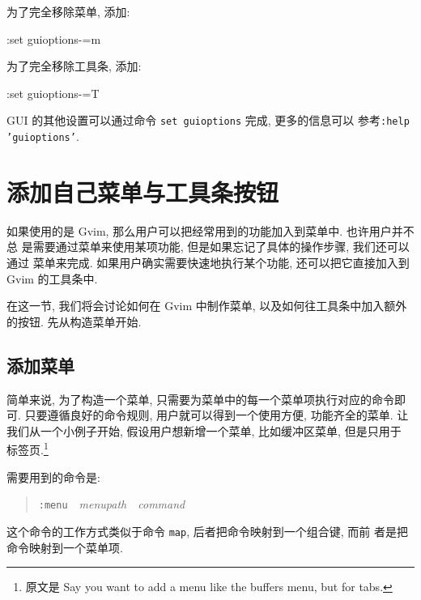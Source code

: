 为了完全移除菜单, 添加:
\begin{vimcmd}
:set guioptions-=m
\end{vimcmd}

为了完全移除工具条, 添加:
\begin{vimcmd}
:set guioptions-=T
\end{vimcmd}

\begin{warning}
    GUI 的其他设置可以通过命令 \texttt{set guioptions} 完成, 更多的信息可以
    参考\texttt{:help 'guioptions'}.
\end{warning}

\section{添加自己菜单与工具条按钮}
\label{sec:adding_your_own_menu_and_toolbar_buttons}
如果使用的是 Gvim, 那么用户可以把经常用到的功能加入到菜单中. 也许用户并不总
是需要通过菜单来使用某项功能, 但是如果忘记了具体的操作步骤, 我们还可以通过
菜单来完成. 如果用户确实需要快速地执行某个功能, 还可以把它直接加入到 Gvim
的工具条中.

在这一节, 我们将会讨论如何在 Gvim 中制作菜单, 以及如何往工具条中加入额外
的按钮. 先从构造菜单开始.

\subsection{添加菜单}
\label{subsec:adding_a_menu}
简单来说, 为了构造一个菜单, 只需要为菜单中的每一个菜单项执行对应的命令即可.
只要遵循良好的命令规则, 用户就可以得到一个使用方便, 功能齐全的菜单.
让我们从一个小例子开始, 假设用户想新增一个菜单, 比如缓冲区菜单, 但是只用于
标签页.\footnote{ 原文是 Say you want to add a menu like the buffers menu,
but for tabs.}

\begin{center}
\end{center}

需要用到的命令是:
\begin{quotation}
\texttt{:menu}\ \ \textit{menupath}\ \ \textit{command}
\end{quotation}
这个命令的工作方式类似于命令 \texttt{map}, 后者把命令映射到一个组合键, 而前
者是把命令映射到一个菜单项.

